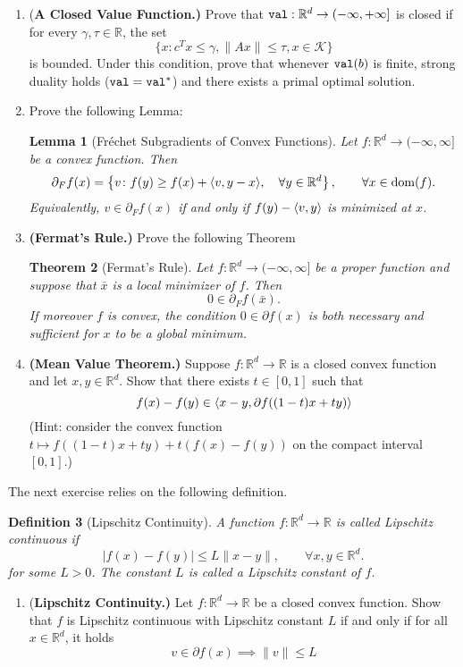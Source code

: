 \documentclass[12pt]{article}
\numberwithin{equation}{section}
\newcommand{\RR}{\mathbb{R}}
\newcommand{\cK}{\mathcal{K}}
\newcommand{\val}{{\rm \texttt{val}}}
\newcommand{\dom}{\mathrm{dom}}
\newtheorem{thm}{Theorem}[section]
\newtheorem{definition}[thm]{Definition}
\newtheorem{lem}[thm]{Lemma}
\theoremstyle{remark}
\DeclarePairedDelimiter{\dotp}{\langle}{\rangle}
\begin{document}
\begin{enumerate}
\item {(\bf A Closed Value Function.)} Prove that $\val : \RR^d \rightarrow (-\infty, +\infty]$ is closed if for every $\gamma, \tau \in \RR$, the set  
$$
\{x \colon c^Tx \leq \gamma, \|Ax\|\leq \tau, x \in \cK\}
$$
is bounded. Under this condition, prove that whenever $\val(b)$ is finite, strong duality holds ($\val = \val^\ast$) and there exists a primal optimal solution. 
\item Prove the following Lemma: 
\begin{lem}[Fr{\'e}chet Subgradients of Convex Functions]\label{eq:frechetconvex}
Let $f \colon \RR^d \rightarrow (-\infty, \infty]$ be a convex function. Then 
$$
\partial_F f(x) = \left\{v \colon f(y) \geq f(x) + \dotp{v, y - x}, \quad \forall y \in \RR^d \right\}, \qquad \forall x \in \dom(f). 
$$
Equivalently, $v \in \partial_F f(x)$ if and only if $f(y) - \dotp{v, y}$ is minimized at $x$. 
\end{lem} 

\item {\bf (Fermat's Rule.)} Prove the following Theorem
\begin{thm}[Fermat's Rule]\label{thm:Fermatrule}
Let $f : \RR^d \rightarrow (-\infty, \infty]$ be a proper function and suppose that $\bar x$ is a local minimizer of $f$. Then 
$$
0 \in \partial_F f(\bar x).
$$
If moreover $f$ is convex, the condition $0 \in \partial f(x)$ is both necessary and sufficient for $x$ to be a global minimum.
\end{thm}

\item {\bf (Mean Value Theorem.)} Suppose $f : \RR^d \rightarrow \RR$ is a closed convex function and let $x, y \in \RR^d$. Show that there exists $t \in [0, 1]$ such that 
$$
f(x) - f(y) \in \dotp{x - y, \partial f((1-t)x + ty)}
$$
(Hint: consider the convex function $t \mapsto f((1-t)x + ty) + t(f(x) - f(y)) $ on the compact interval $[0,1]$.)
\end{enumerate}
The next exercise relies on the following definition. 
\begin{definition}[Lipschitz Continuity] A function $ f: \RR^d \rightarrow \RR$ is called \emph{Lipschitz continuous} if 
$$
|f(x) - f(y)| \leq L \|x - y\|, \qquad \forall x, y \in \RR^d.
$$
for some $L > 0$. The constant $L$ is called a \emph{Lipschitz constant} of $f$.  
\end{definition}

\begin{enumerate}[resume]
\item {(\bf Lipschitz Continuity.)}  Let $f : \RR^d \rightarrow \RR$ be a closed convex function. Show that $f$ is Lipschitz continuous with Lipschitz constant $L$ if and only if for all $x \in \RR^d$, it holds 
$$
v \in \partial f(x) \implies \|v\| \leq L
$$
\end{enumerate}
\end{document}
